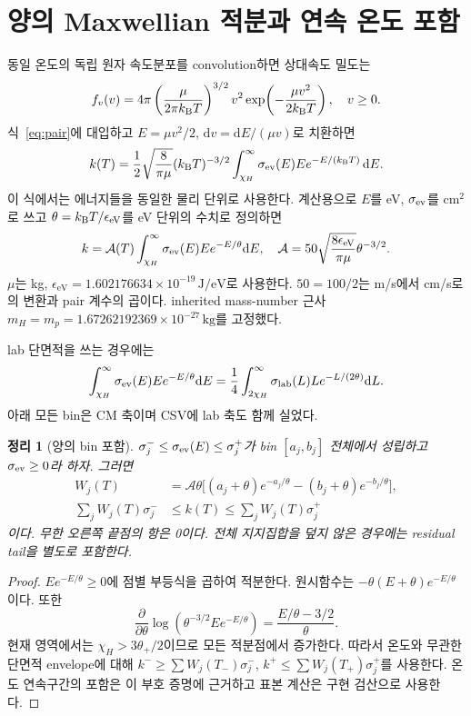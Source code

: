 \documentclass[11pt,a4paper]{article}
\newcommand{\dd}{\mathrm d}\newcommand{\eV}{\mathrm{eV}}\newcommand{\kb}{k_{\rm B}}\newcommand{\ev}{\epsilon_{\eV}}
\newcommand{\sig}{\sigma_{\rm ev}}\newcommand{\cm}{\mathrm{CM}}\newcommand{\lab}{\mathrm{lab}}\newcommand{\hh}{\mathrm{HH}}
\newtheorem{theorem}{정리}[section]
\begin{document}
\newpage
\section{양의 Maxwellian 적분과 연속 온도 포함}
동일 온도의 독립 원자 속도분포를 convolution하면 상대속도 밀도는
\begin{equation}
f_v(v)=4\pi\left(\frac{\mu}{2\pi\kb T}\right)^{3/2}
v^2\exp\!\left(-\frac{\mu v^2}{2\kb T}\right),\quad v\ge0.
\end{equation}
식~\eqref{eq:pair}에 대입하고 $E=\mu v^2/2$, $\dd v=\dd E/(\mu v)$로 치환하면
\begin{equation}\label{eq:maxwell}
k(T)=\frac12\sqrt{\frac8{\pi\mu}}(\kb T)^{-3/2}
\int_{\chi_H}^{\infty}\sig(E)E e^{-E/(\kb T)}\,\dd E.
\end{equation}
이 식에서는 에너지들을 동일한 물리 단위로 사용한다. 계산용으로 $E$를 eV, $\sig$를 $\mathrm{cm^2}$로 쓰고 $\theta=\kb T/\ev$를 eV 단위의 수치로 정의하면
\begin{equation}
k=\mathcal A(T)\int_{\chi_H}^{\infty}\sig(E)E e^{-E/\theta}\dd E,
\quad \mathcal A=50\sqrt{\frac{8\ev}{\pi\mu}}\theta^{-3/2}.
\end{equation}
$\mu$는 kg, $\ev=1.602176634\times10^{-19}\,\mathrm{J/eV}$로 사용한다. $50=100/2$는 m/s에서 cm/s로의 변환과 pair 계수의 곱이다. inherited mass-number 근사 $m_H=m_p=1.67262192369\times10^{-27}\,\mathrm{kg}$를 고정했다.

lab 단면적을 쓰는 경우에는
\begin{equation}
\int_{\chi_H}^{\infty}\sig(E)E e^{-E/\theta}\dd E
=\frac14\int_{2\chi_H}^{\infty}\sigma_{\lab}(L)L e^{-L/(2\theta)}\dd L.
\end{equation}
아래 모든 bin은 CM 축이며 CSV에 lab 축도 함께 실었다.

\begin{theorem}[양의 bin 포함]
$\sigma_j^-\le\sig(E)\le\sigma_j^+$가 bin $[a_j,b_j]$ 전체에서 성립하고 $\sig\ge0$라 하자. 그러면
\begin{align}
W_j(T)&=\mathcal A\theta\bigl[(a_j+\theta)e^{-a_j/\theta}-(b_j+\theta)e^{-b_j/\theta}\bigr],\\
\sum_jW_j(T)\sigma_j^-&\le k(T)\le\sum_jW_j(T)\sigma_j^+
\end{align}
이다. 무한 오른쪽 끝점의 항은 0이다. 전체 지지집합을 덮지 않은 경우에는 residual tail을 별도로 포함한다.
\end{theorem}
\begin{proof}
$E e^{-E/\theta}\ge0$에 점별 부등식을 곱하여 적분한다. 원시함수는 $-\theta(E+\theta)e^{-E/\theta}$이다. 또한
\begin{equation}\label{eq:tmono}
\frac{\partial}{\partial\theta}\log\!\left(\theta^{-3/2}Ee^{-E/\theta}\right)
=\frac{E/\theta-3/2}{\theta}.
\end{equation}
현재 영역에서는 $\chi_H>3\theta_+/2$이므로 모든 적분점에서 증가한다. 따라서 온도와 무관한 단면적 envelope에 대해 $k^-\ge\sum W_j(T_-)\sigma_j^-$, $k^+\le\sum W_j(T_+)\sigma_j^+$를 사용한다. 온도 연속구간의 포함은 이 부호 증명에 근거하고 표본 계산은 구현 검산으로 사용한다.
\end{proof}
\end{document}
